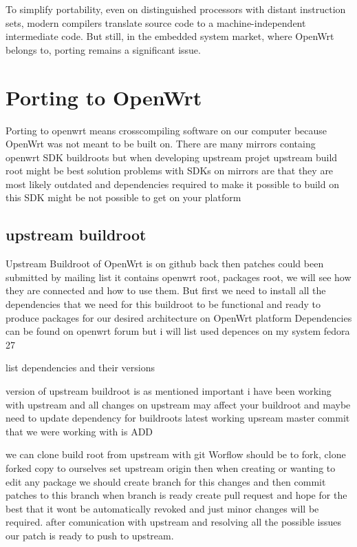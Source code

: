 To simplify portability, even on distinguished processors with distant instruction sets, modern compilers translate source code to a machine-independent intermediate code.
But still, in the embedded system market, where OpenWrt belongs to, porting remains a significant issue.

\section{Porting to OpenWrt}

Porting to openwrt means crosscompiling software on our computer because OpenWrt was not meant to be built on.
There are many mirrors containg openwrt SDK buildroots but when developing upstream projet upstream build root might be best solution
problems with SDKs on mirrors are that they are most likely outdated and dependencies required to make it possible to build on this SDK might be not possible to get on your platform

\subsection{upstream buildroot}

Upstream Buildroot of OpenWrt is on github back then patches could been submitted by mailing list
it contains openwrt root, packages root, we will see how they are connected and how to use them.
But first we need to install all the dependencies that we need for this buildroot to be functional and ready to produce packages for our desired architecture on OpenWrt platform
Dependencies can be found on openwrt forum but i will list used depences on my system fedora 27

list dependencies and their versions

version of upstream buildroot is as mentioned important i have been working with upstream and all changes on upstream may affect your buildroot and maybe need to update dependency for buildroots
latest working upsream master commit that we were working with is ADD

we can clone build root from upstream with git Worflow should be to fork, clone forked copy to ourselves set upstream origin then when creating or wanting to edit any package we should create branch for this changes and then commit patches to this branch
when branch is ready create pull request and hope for the best that it wont be automatically revoked and just minor changes will be required.
after comunication with upstream and resolving all the possible issues our patch is ready to push to upstream.

